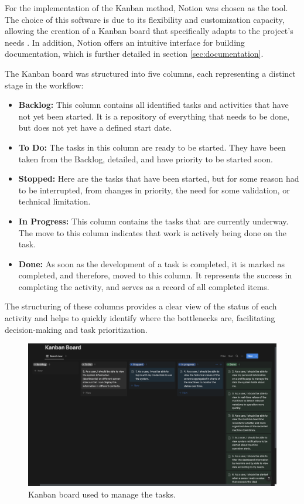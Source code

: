 For the implementation of the Kanban method, Notion was chosen as the tool. The choice of this software is due to its flexibility and customization capacity, allowing the creation of a Kanban board that specifically adapts to the project's needs \cite{notionProjectManagement}. In addition, Notion offers an intuitive interface for building documentation, which is further detailed in section \ref{sec:documentation}.

The Kanban board was structured into five columns, each representing a distinct stage in the workflow:

\begin{itemize}
    \item \textbf{Backlog:} This column contains all identified tasks and activities that have not yet been started. It is a repository of everything that needs to be done, but does not yet have a defined start date.
    \item \textbf{To Do:} The tasks in this column are ready to be started. They have been taken from the Backlog, detailed, and have priority to be started soon.
    \item \textbf{Stopped:} Here are the tasks that have been started, but for some reason had to be interrupted, from changes in priority, the need for some validation, or technical limitation.
    \item \textbf{In Progress:} This column contains the tasks that are currently underway. The move to this column indicates that work is actively being done on the task.
    \item \textbf{Done:} As soon as the development of a task is completed, it is marked as completed, and therefore, moved to this column. It represents the success in completing the activity, and serves as a record of all completed items.
\end{itemize}

The structuring of these columns provides a clear view of the status of each activity and helps to quickly identify where the bottlenecks are, facilitating decision-making and task prioritization.

\begin{figure}[htbp]
	\centering
	\includegraphics[scale=0.25]{images/kanban_board}
	\caption{Kanban board used to manage the tasks.}
	\label{fig:BoardKanban}
\end{figure}

